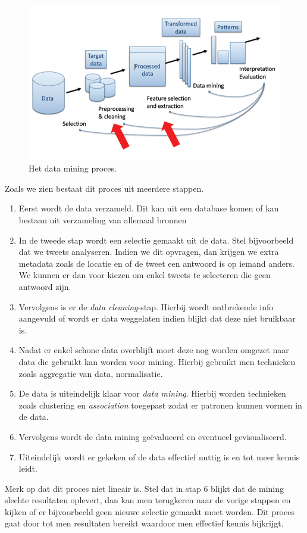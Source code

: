 \begin{figure}
\includegraphics[]{res/kdd_process.png}
\caption{Het data mining proces.}
\end{figure}
Zoals we zien bestaat dit proces uit meerdere stappen.

\begin{enumerate}
\item Eerst wordt de data verzameld. Dit kan uit een database komen of kan bestaan uit verzameling van allemaal bronnen
\item In de tweede stap wordt een selectie gemaakt uit de data. Stel bijvoorbeeld dat we tweets analyseren. Indien we dit opvragen, dan krijgen we extra metadata zoals de locatie en of de tweet een antwoord is op iemand anders. We kunnen er dan voor kiezen om enkel tweets te selecteren die geen antwoord zijn.
\item Vervolgens is er de \emph{data cleaning}-stap. Hierbij wordt ontbrekende info aangevuld of wordt er data weggelaten indien blijkt dat deze niet bruikbaar is.
\item Nadat er enkel schone data overblijft moet deze nog worden omgezet naar data die gebruikt kan worden voor mining. Hierbij gebruikt men technieken zoals aggregatie van data, normalisatie.
\item De data is uiteindelijk klaar voor \emph{data mining}. Hierbij worden technieken zoals clustering en \emph{association} toegepast zodat er patronen kunnen vormen in de data.
\item Vervolgens wordt de data mining ge\"evalueerd en eventueel gevisualiseerd. 
\item Uiteindelijk wordt er gekeken of de data effectief nuttig is en tot meer kennis leidt.
\end{enumerate}
Merk op dat dit proces niet lineair is. Stel dat in stap 6 blijkt dat de mining slechte resultaten oplevert, dan kan men terugkeren naar de vorige stappen en kijken of er bijvoorbeeld geen nieuwe selectie gemaakt moet worden. Dit proces gaat door tot men resultaten bereikt waardoor men effectief kennis bijkrijgt.

